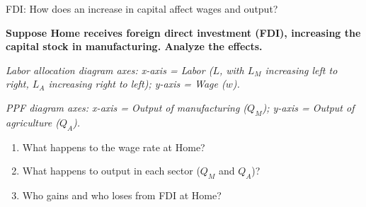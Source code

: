 \documentclass{beamer}
\begin{document}

\begin{frame}{FDI: How does an increase in capital affect wages and output?}

\textbf{Suppose Home receives foreign direct investment (FDI), increasing the capital stock in manufacturing. Analyze the effects.}

\vspace{0.2cm}

\textit{Labor allocation diagram axes: x-axis = Labor ($L$, with $L_M$ increasing left to right, $L_A$ increasing right to left); y-axis = Wage ($w$).}

\vspace{0.1cm}

\textit{PPF diagram axes: x-axis = Output of manufacturing ($Q_M$); y-axis = Output of agriculture ($Q_A$).}

\vspace{0.3cm}

\begin{enumerate}
    \item What happens to the wage rate at Home?
    \item What happens to output in each sector ($Q_M$ and $Q_A$)?
    \item Who gains and who loses from FDI at Home?
\end{enumerate}

\end{frame}


\end{document}
